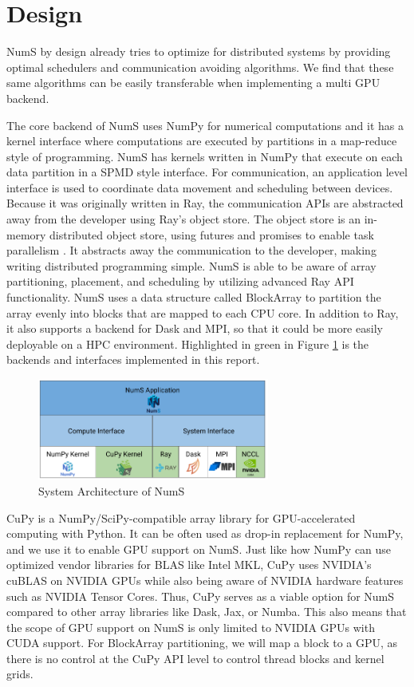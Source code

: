 \documentclass{article}
\begin{document}
\section{Design}
NumS by design already tries to optimize for distributed systems by providing optimal schedulers and communication avoiding algorithms. \cite{nums} We find that these same algorithms can be easily transferable when implementing a multi GPU backend.

The core backend of NumS uses NumPy for numerical computations and it has a kernel interface where computations are executed by partitions in a map-reduce style of programming. NumS has kernels written in NumPy that execute on each data partition in a SPMD style interface. For communication, an application level interface is used to coordinate data movement and scheduling between devices. Because it was originally written in Ray, the communication APIs are abstracted away from the developer using Ray's object store. The object store is an in-memory distributed object store, using futures and promises to enable task parallelism \cite{ray}. It abstracts away the communication to the developer, making writing distributed programming simple. NumS is able to be aware of array partitioning, placement, and scheduling by utilizing advanced Ray API functionality. NumS uses a data structure called BlockArray to partition the array evenly into blocks that are mapped to each CPU core. In addition to Ray, it also supports a backend for Dask and MPI, so that it could be more easily deployable on a HPC environment. Highlighted in green in Figure \ref{fig:system_arch} is the backends and interfaces implemented in this report.

\begin{figure}
  \centerline{\includegraphics[width=3in]{figures/system_architecture.png}}
  \caption{System Architecture of NumS}
  \label{fig:system_arch}
\end{figure}

CuPy is a NumPy/SciPy-compatible array library for GPU-accelerated computing with Python. It can be often used as drop-in replacement for NumPy, and we use it to enable GPU support on NumS. \cite{cupy} Just like how NumPy can use optimized vendor libraries for BLAS like Intel MKL, CuPy uses NVIDIA's cuBLAS on NVIDIA GPUs while also being aware of NVIDIA hardware features such as NVIDIA Tensor Cores. Thus, CuPy serves as a viable option for NumS compared to other array libraries like Dask, Jax, or Numba. This also means that the scope of GPU support on NumS is only limited to NVIDIA GPUs with CUDA support. For BlockArray partitioning, we will map a block to a GPU, as there is no control at the CuPy API level to control thread blocks and kernel grids. 
\end{document}
